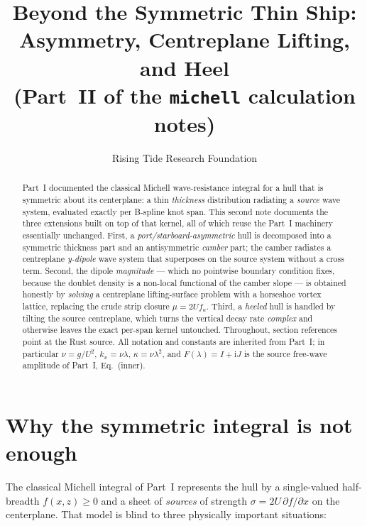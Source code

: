 \documentclass[11pt]{article}
\title{Beyond the Symmetric Thin Ship:\\
Asymmetry, Centreplane Lifting, and Heel\\
\large (Part~II of the \texttt{michell} calculation notes)}
\author{Rising Tide Research Foundation}
\date{}
\newcommand{\ii}{\mathrm{i}}
\begin{document}
\maketitle

\begin{abstract}
Part~I documented the classical Michell wave-resistance integral for a hull
that is symmetric about its centerplane: a thin \emph{thickness} distribution
radiating a \emph{source} wave system, evaluated exactly per B-spline knot span.
This second note documents the three extensions built on top of that kernel, all
of which reuse the Part~I machinery essentially unchanged. First, a
\emph{port/starboard-asymmetric} hull is decomposed into a symmetric thickness
part and an antisymmetric \emph{camber} part; the camber radiates a centreplane
\emph{y-dipole} wave system that superposes on the source system without a cross
term. Second, the dipole \emph{magnitude} --- which no pointwise boundary
condition fixes, because the doublet density is a non-local functional of the
camber slope --- is obtained honestly by \emph{solving} a centreplane
lifting-surface problem with a horseshoe vortex lattice, replacing the crude
strip closure $\mu = 2U f_a$. Third, a \emph{heeled} hull is handled by tilting
the source centreplane, which turns the vertical decay rate \emph{complex} and
otherwise leaves the exact per-span kernel untouched. Throughout, section
references point at the Rust source. All notation and constants are inherited
from Part~I; in particular $\nu = g/U^2$, $k_x = \nu\lambda$,
$\kappa = \nu\lambda^2$, and $F(\lambda) = I + \ii J$ is the source free-wave
amplitude of Part~I, Eq.~(inner).
\end{abstract}

\tableofcontents

\section{Why the symmetric integral is not enough}
\label{sec:motivation}

The classical Michell integral of Part~I represents the hull by a single-valued
half-breadth $f(x,z)\ge 0$ and a sheet of \emph{sources} of strength
$\sigma = 2U\,\partial f/\partial x$ on the centerplane. That model is blind to
three physically important situations:
\end{document}
